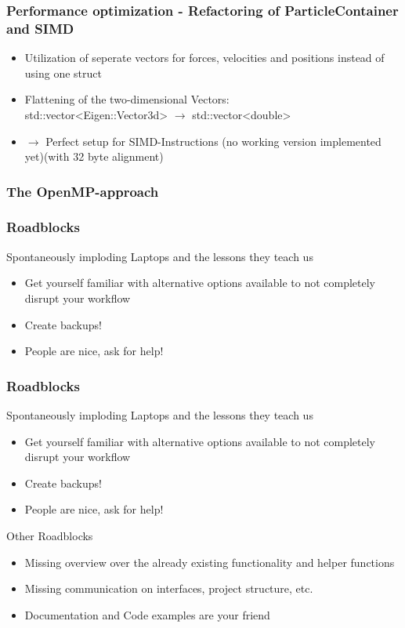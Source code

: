 \begin{frame}
	\frametitle{Performance optimization - Refactoring of ParticleContainer and SIMD}
	\large
	\vspace{1cm}
	\begin{itemize}
	\item<1-> Utilization of seperate vectors for forces, velocities and positions instead of using one struct
	\item<2-> Flattening of the two-dimensional Vectors: \\
	std::vector<Eigen::Vector3d> $\rightarrow$ std::vector<double> \\
	\item<3->[]\Large $\longrightarrow$ Perfect setup for SIMD-Instructions (no working version implemented yet)(with 32 byte alignment)
	
	\end{itemize}
	
\end{frame}

\begin{frame}
	\frametitle{The OpenMP-approach}
	
	
\end{frame}

\begin{frame}
	\frametitle{Roadblocks}
	\Large
	Spontaneously imploding Laptops and the lessons they teach us
	\large
	\begin{itemize}
		\item<1-> Get yourself familiar with alternative options available to not completely disrupt your workflow
		\item<2-> Create backups!
		\item<3-> People are nice, ask for help!
	\end{itemize}
	
\end{frame}

\begin{frame}
	\frametitle{Roadblocks}
	\Large
	Spontaneously imploding Laptops and the lessons they teach us
	\large
	\begin{itemize}
		\item Get yourself familiar with alternative options available to not completely disrupt your workflow
		\item Create backups!
		\item People are nice, ask for help!
	\end{itemize}

	\Large
	Other Roadblocks
	\large
	\begin{itemize}
		\item<1->  Missing overview over the already existing functionality and helper functions
		\item<2->  Missing communication on interfaces, project structure, etc.
		\item<3-> Documentation and Code examples are your friend
	\end{itemize}
	
\end{frame}

